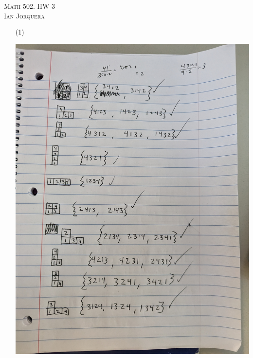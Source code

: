 \documentclass[12pt]{amsart}
\theoremstyle{definition}
\begin{document}
\begin{center}
    \textsc{Math 502. HW 3\\ Ian Jorquera}
\end{center}
\vspace{1em}

\begin{itemize}

\item[(1)] 

\includegraphics[scale=.1]{pics/hw3PXL_20230208_221932464.jpg}\\


\end{itemize}
\end{document}
